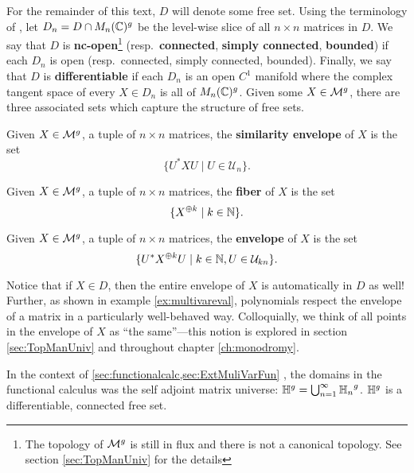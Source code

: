 For the remainder of this text, \(D\) will denote some free set. Using the
terminology of \cite{pascoeFreeNoncommutativePrincipal2020}, let
\(D_n = D \cap M_n(\mathbb{C})^g\) be the level-wise slice of all \(n \times n\)
matrices in \(D\). We say that \(D\) is \textbf{nc-open}\footnote{The topology of \(\mathcal{M}^g\)
  is still in flux and there is not a canonical topology. See section \ref{sec:TopManUniv} for
  the details } (resp.\ \textbf{connected}, \textbf{simply connected}, \textbf{bounded}) if each \(D_n\) is open
(resp.\ connected, simply connected, bounded). Finally, we say that \(D\) is
\textbf{differentiable} if each \(D_n\) is an open \(C^1\) manifold where the
complex tangent space of every \(X \in D_n\) is all of \(M_n(\mathbb{C})^g\).
Given some \(X \in \mathcal{M}^{g} \), there are three associated sets which capture the
structure of free sets.

\begin{definition}%
\label{def:semenv}
  Given \(X \in \mathcal{M}^{g} \), a tuple of \(n \times n\) matrices, the
  \textbf{similarity envelope} of \(X\) is the set
  \[
    \{U^* X U \mid  U \in \mathcal{U}_n\}.
  \]
\end{definition}

\begin{definition}[Fiber]%
\label{def:fiber}
  Given \(X \in \mathcal{M}^{g} \), a tuple of \(n \times n\) matrices, the
  \textbf{fiber} of \(X\) is the set
  \[
    \{X^{\oplus k} \mid  k \in \mathbb{N} \}.
  \]
\end{definition}

\begin{definition}[Envelope]%
\label{def:env}
  Given \(X \in \mathcal{M}^{g} \), a tuple of \(n \times n\) matrices, the
  \textbf{envelope} of \(X\) is the set
  \[
    \{ U^* X^{\oplus k} U \mid k \in \mathbb{N}, U \in \mathcal{U}_{kn} \}.
  \]
\end{definition}
Notice that if \(X \in D\), then the entire envelope of \(X\) is automatically
in \(D\) as well! Further, as shown in example \ref{ex:multivareval},
polynomials respect the envelope of a matrix in a particularly well-behaved way.
Colloquially, we think of all points in the envelope of \(X\) as ``the
same''---this notion is explored in section \ref{sec:TopManUniv} and throughout
chapter \ref{ch:monodromy}.

In the context of \cref{sec:functionalcalc,sec:ExtMuliVarFun}
%
, the domains in the functional calculus was the self adjoint matrix universe:
\(\mathbb{H}^g = \bigcup_{n=1}^{\infty} {\mathbb{H}_n}^g\). \(\mathbb{H} ^g\) is a differentiable, connected
free set.

